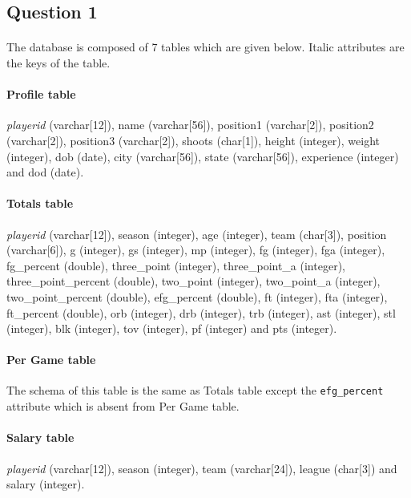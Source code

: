 
\subsection{Question 1}
\label{subsec:411}

\paragraph{}The database is composed of 7 tables which are given below. Italic attributes are the keys of the table.

\paragraph{Profile table}\textit{playerid} (varchar[12]), name (varchar[56]), position1 (varchar[2]), position2 (varchar[2]), position3 (varchar[2]), shoots (char[1]), height (integer), weight (integer), dob (date), city (varchar[56]), state (varchar[56]), experience (integer) and dod (date).

\paragraph{Totals table}\textit{playerid} (varchar[12]), season (integer), age (integer), team (char[3]), position (varchar[6]), g (integer), gs (integer), mp (integer), fg (integer), fga (integer), fg\_percent (double), three\_point (integer), three\_point\_a (integer), three\_point\_percent (double), two\_point (integer), two\_point\_a (integer), two\_point\_percent (double), efg\_percent (double), ft (integer), fta (integer), ft\_percent (double), orb (integer), drb (integer), trb (integer), ast (integer), stl (integer), blk (integer), tov (integer), pf (integer) and pts (integer).

\paragraph{Per Game table}The schema of this table is the same as Totals table except the \texttt{efg\_percent} attribute which is absent from Per Game table.

\paragraph{Salary table}\textit{playerid} (varchar[12]), season (integer), team (varchar[24]), league (char[3]) and salary (integer).

